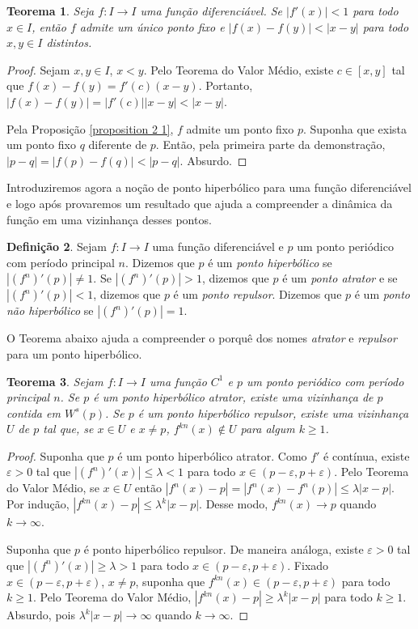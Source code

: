 \documentclass[a4paper, 12pt]{article}
\theoremstyle{definition}
\newtheorem{definition}{Definição}[section]
\theoremstyle{plain}
\theoremstyle{plain}
\theoremstyle{plain}
\newtheorem{theorem}[definition]{Teorema}
\theoremstyle{definition}
\theoremstyle{remark}
\begin{document}
\begin{theorem}
Seja $f:I \to I$ uma função diferenciável. Se $|f'(x)|<1$ para todo $x \in I$, então $f$ admite um único ponto fixo e $|f(x) - f(y)| < |x - y|$ para todo $x, y \in I$ distintos.
\end{theorem}

\begin{proof}
Sejam $x, y \in I$, $x < y$. Pelo Teorema do Valor Médio, existe $c \in [x, y]$ tal que $f(x) - f(y) = f'(c)(x - y)$. Portanto, $|f(x) - f(y)| = |f'(c)||x - y| < |x - y|$.

Pela Proposição \ref{proposition 2 1}, $f$ admite um ponto fixo $p$. Suponha que exista um ponto fixo $q$ diferente de $p$. Então, pela primeira parte da demonstração, $|p - q| = |f(p) - f(q)| < |p - q|$. Absurdo.
\end{proof}

Introduziremos agora a noção de ponto hiperbólico para uma função diferenciável e logo após provaremos um resultado que ajuda a compreender a dinâmica da função em uma vizinhança desses pontos.

\begin{definition}
Sejam $f: I \to I$ uma função diferenciável e $p$ um ponto periódico com período principal $n$. Dizemos que $p$ é um \textit{ponto hiperbólico} se $|(f^n)'(p)| \neq 1$. Se $|(f^n)'(p)| > 1$, dizemos que $p$ é um \textit{ponto atrator} e se $|(f^n)'(p)| < 1$, dizemos que $p$ é um \textit{ponto  repulsor}. Dizemos que $p$ é um \textit{ponto não hiperbólico} se $|(f^n)'(p)| = 1$.
\end{definition}

O Teorema abaixo ajuda a compreender o porquê dos nomes \textit{atrator} e \textit{repulsor} para um ponto hiperbólico.

\begin{theorem}
Sejam $f: I \to I$ uma função $C^1$ e $p$ um ponto periódico com período principal $n$. Se $p$ é um ponto hiperbólico atrator, existe uma vizinhança de $p$ contida em $W^s(p)$. Se $p$ é um ponto hiperbólico repulsor, existe uma vizinhança $U$ de $p$ tal que, se $x \in U$ e $x \neq p$, $f^{kn}(x) \notin U$ para algum $k \geq 1$. 
\end{theorem}

\begin{proof}
Suponha que $p$ é um ponto hiperbólico atrator. Como $f'$ é contínua, existe $\varepsilon > 0$ tal que $|(f^n)'(x)| \leq \lambda < 1$ para todo $x \in (p - \varepsilon, p + \varepsilon)$. Pelo Teorema do Valor Médio, se $x \in U$ então $|f^n(x) - p| = |f^n(x) - f^n(p)| \leq \lambda|x - p|$. Por indução, $|f^{kn}(x) - p| \leq \lambda^k|x - p|$. Desse modo, $f^{kn}(x) \to p$ quando $k \to \infty$.

Suponha que $p$ é ponto hiperbólico repulsor. De maneira análoga, existe $\varepsilon > 0$ tal que $|(f^n)'(x)| \geq \lambda > 1$ para todo $x \in (p- \varepsilon, p + \varepsilon)$. Fixado $x \in (p - \varepsilon, p + \varepsilon)$, $x \neq p$, suponha que $f^{kn}(x) \in (p - \varepsilon, p + \varepsilon)$ para todo $k \geq 1$. Pelo Teorema do Valor Médio, $|f^{kn}(x) - p| \geq \lambda^k|x - p|$ para todo $k \geq 1$. Absurdo, pois $\lambda^k|x - p| \to \infty$ quando $k \to \infty$.
\end{proof}
\end{document}
